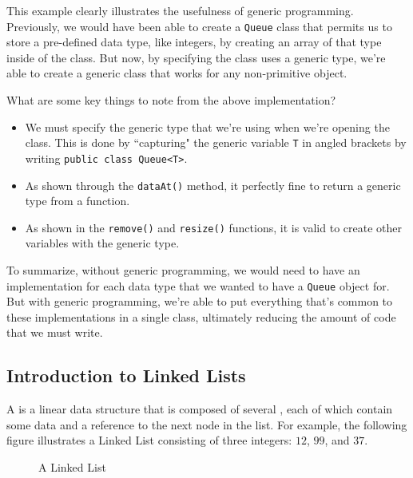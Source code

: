 This example clearly illustrates the usefulness of generic programming. Previously, we would have been able to create a \verb!Queue! class that permits us to store a pre-defined data type, like integers, by creating an array of that type inside of the class. But now, by specifying the class uses a generic type, we're able to create a generic class that works for any non-primitive object. 

What are some key things to note from the above implementation?
\begin{itemize}
    \item We must specify the generic type that we're using when we're opening the class. This is done by ``capturing" the generic variable \verb!T! in angled brackets by writing \verb!public class Queue<T>!. 
    \item As shown through the \verb!dataAt()! method, it perfectly fine to return a generic type from a function.
    \item As shown in the \verb!remove()! and \verb!resize()! functions, it is valid to create other variables with the generic type. 
\end{itemize}

To summarize, without generic programming, we would need to have an implementation for each data type that we wanted to have a \verb!Queue! object for. But with generic programming, we're able to put everything that's common to these implementations in a single class, ultimately reducing the amount of code that we must write.

\subsection{Introduction to Linked Lists}  
A  is a linear data structure that is composed of several , each of which contain some data and a reference to the next node in the list. For example, the following figure illustrates a Linked List consisting of three integers: $12$, $99$, and $37$. 

\begin{figure}[h]
\centering
{}
\caption{A Linked List}
\end{figure}

